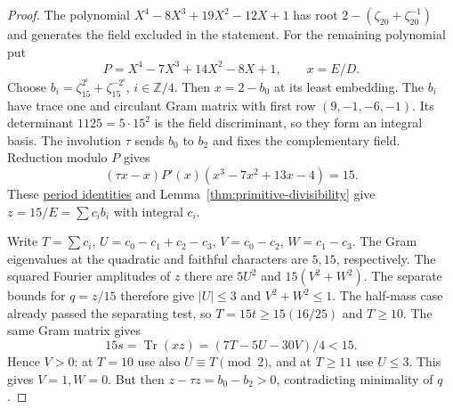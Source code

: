 \documentclass[11pt,reqno]{amsart}
\newcommand{\codecheck}[2]{\href{https://github.com/sebastienpalcoux/grothendieck-ring-classification/blob/d5750105bb5758f3ad38d2e5464dfcc12c019816/supplements/rank6/sphericality/#1}{#2}}
\theoremstyle{remark}\newtheorem{remark}[theorem]{Remark}
\numberwithin{equation}{section}
\begin{document}
\begin{proof}
The polynomial $X^4-8X^3+19X^2-12X+1$ has root $2-(\zeta_{20}+\zeta_{20}^{-1})$ and generates the field excluded in the statement. For the remaining polynomial put
\[
           P=X^4-7X^3+14X^2-8X+1,\qquad x=E/D .
\]
Choose $b_i=\zeta_{15}^{2^i}+\zeta_{15}^{-2^i}$, $i\in\mathbb Z/4$.
Then $x=2-b_0$ at its least embedding. The $b_i$ have trace one and
circulant Gram matrix with first row $(9,-1,-6,-1)$. Its determinant
$1125=5\cdot15^2$ is the field discriminant, so they form an integral
basis. The involution $\tau$ sends $b_0$ to $b_2$ and fixes the
complementary field. Reduction modulo $P$ gives
\[
 (\tau x-x)P'(x)(x^3-7x^2+13x-4)=15 .
\]
These \codecheck{generic_quartic/c15_lattice.py}{period identities}
and Lemma~\ref{thm:primitive-divisibility} give
$z=15/E=\sum c_i b_i$ with integral $c_i$.

Write $T=\sum c_i$, $U=c_0-c_1+c_2-c_3$, $V=c_0-c_2$, $W=c_1-c_3$.
The Gram eigenvalues at the quadratic and faithful characters are
$5,15$, respectively. The squared Fourier amplitudes of $z$ there
are $5U^2$ and $15(V^2+W^2)$. The separate bounds for $q=z/15$
therefore give $|U|\le3$ and $V^2+W^2\le1$.
The half-mass case already passed the separating test, so
$T=15t\ge15(16/25)$ and $T\ge10$. The same Gram matrix gives
\[
 15s=\operatorname{Tr}(xz)=(7T-5U-30V)/4<15 .
\]
Hence $V>0$: at $T=10$ use also $U\equiv T\pmod2$, and at
$T\ge11$ use $U\le3$. This gives $V=1,W=0$. But then
$z-\tau z=b_0-b_2>0$, contradicting minimality of $q$.

\end{proof}
\end{document}
